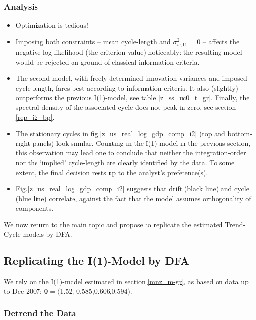 \documentclass[a4paper]{book}
\begin{document}
\subsubsection{Analysis}
\begin{itemize}
\item Optimization is tedious!
\item Imposing both constraints -- mean cycle-length and $\sigma_{w,11}^2=0$ -- affects the negative log-likelihood (the criterion value) noticeably: the resulting model would be rejected on ground of classical information criteria.
\item The second model, with freely determined innovation variances and imposed cycle-length, fares best according to information criteria. It also (slightly) outperforms the previous I(1)-model, see table \ref{z_ss_uc0_t_gr}. Finally,  the spectral density of the associated cycle does not peak in zero, see section \ref{rep_i2_bp}.
\item The stationary cycles in fig.\ref{z_us_real_log_gdp_comp_i2} (top and bottom-right panels) look similar. Counting-in the I(1)-model in the previous section, this observation may lead one to conclude that neither the integration-order nor the `implied' cycle-length are clearly identified by the data. To some extent, the final decision rests up to the analyst's preference(s). 
\item Fig.\ref{z_us_real_log_gdp_comp_i2} suggests that drift (black line) and cycle (blue line) correlate, against the fact that the model assumes orthogonality of components.  
\end{itemize}
We now return to the main topic and propose to replicate the estimated Trend-Cycle models by DFA. 



\subsection{Replicating the I(1)-Model by DFA}\label{rep_cy_mba_dfa}


We  rely on the I(1)-model estimated in section \ref{mnz_m-gr}, as based on data up to Dec-2007: $\boldsymbol{\theta}=($1.52,-0.585,0.606,0.594). 



\subsubsection{Detrend the Data}
\end{document}
